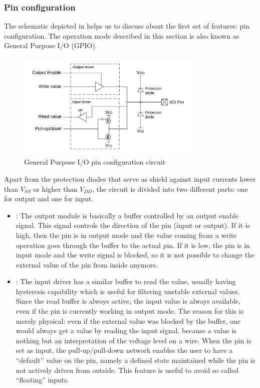 \subsubsection{Pin configuration}
\label{sec:pinconf}

The schematic depicted in  helps us to discuss about the first set of features: pin configuration.
The operation mode described in this section is also known as General Purpose I/O (GPIO).

\begin{figure}[h]
\centerline{\includegraphics[width=0.8\textwidth]{res/pinconf}}
\caption{General Purpose I/O pin configuration circuit \label{fig:pinconf}}
\end{figure}

Apart from the protection diodes that serve as shield against input currents lower than $V_{SS}$ or higher than $V_{DD}$,
the circuit is divided into two different parts: one for output and one for input.
\begin{itemize}
	\item {}:
		The output module is basically a buffer controlled by an output enable signal.
		This signal controls the direction of the pin (input or output). If it is high, then the pin is in output mode
		and the value coming from a write operation goes through the buffer to the actual pin.
		If it is low, the pin is in input mode and the write signal is blocked, so it is not possible to change the external value of the pin from inside anymore.
	\item {}:
		The input driver has a similar buffer to read the value, usually having hysteresis capability which is useful for filtering unstable external values.
		Since the read buffer is always active, the input value is always available, even if the pin is currently working in output mode.
		The reason for this is merely physical: even if the external value was blocked by the buffer,
		one would always get a value by reading the input signal, because a value is nothing but an interpretation of the voltage level on a wire.
		When the pin is set as input, the pull-up/pull-down network enables the user to have a ``default'' value on the pin,
		namely a defined state maintained while the pin is not actively driven from outside. This feature is useful to avoid so called ``floating'' inputs.
\end{itemize}

